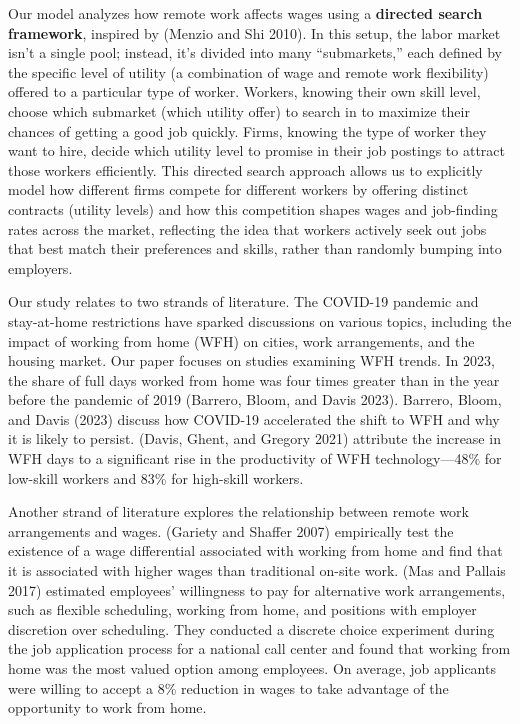 \documentclass[
  11pt,
  letterpaper,
  DIV=11,
  numbers=noendperiod]{scrartcl}
\theoremstyle{plain}
\theoremstyle{remark}
\begin{document}
Our model analyzes how remote work affects wages using a
\textbf{directed search framework}, inspired by (Menzio and Shi 2010).
In this setup, the labor market isn't a single pool; instead, it's
divided into many ``submarkets,'' each defined by the specific level of
utility (a combination of wage and remote work flexibility) offered to a
particular type of worker. Workers, knowing their own skill level,
choose which submarket (which utility offer) to search in to maximize
their chances of getting a good job quickly. Firms, knowing the type of
worker they want to hire, decide which utility level to promise in their
job postings to attract those workers efficiently. This directed search
approach allows us to explicitly model how different firms compete for
different workers by offering distinct contracts (utility levels) and
how this competition shapes wages and job-finding rates across the
market, reflecting the idea that workers actively seek out jobs that
best match their preferences and skills, rather than randomly bumping
into employers.

Our study relates to two strands of literature. The COVID-19 pandemic
and stay-at-home restrictions have sparked discussions on various
topics, including the impact of working from home (WFH) on cities, work
arrangements, and the housing market. Our paper focuses on studies
examining WFH trends. In 2023, the share of full days worked from home
was four times greater than in the year before the pandemic of 2019
(Barrero, Bloom, and Davis 2023). Barrero, Bloom, and Davis (2023)
discuss how COVID-19 accelerated the shift to WFH and why it is likely
to persist. (Davis, Ghent, and Gregory 2021) attribute the increase in
WFH days to a significant rise in the productivity of WFH
technology---48\% for low-skill workers and 83\% for high-skill workers.

Another strand of literature explores the relationship between remote
work arrangements and wages. (Gariety and Shaffer 2007) empirically test
the existence of a wage differential associated with working from home
and find that it is associated with higher wages than traditional
on-site work. (Mas and Pallais 2017) estimated employees' willingness to
pay for alternative work arrangements, such as flexible scheduling,
working from home, and positions with employer discretion over
scheduling. They conducted a discrete choice experiment during the job
application process for a national call center and found that working
from home was the most valued option among employees. On average, job
applicants were willing to accept a 8\% reduction in wages to take
advantage of the opportunity to work from home.
\end{document}
